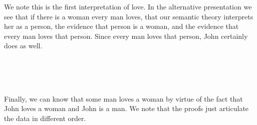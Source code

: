 We note this is the first interpretation of love. In the alternative
presentation we see that if there is a woman every man loves, that our semantic
theory interprets her as a person, the evidence that person is a woman, and the
evidence that every man loves that person. Since every man loves that person,
John certainly does as well.

\begin{code}%
\>[0]\<%
\\
\>[0]\AgdaSpace{}%
\AgdaSymbol{:}\AgdaSpace{}%
\AgdaSpace{}%
\AgdaSpace{}%
\<%
\\
\>[0]\AgdaSpace{}%
\AgdaSymbol{(}\AgdaSpace{}%
\AgdaOperator{\AgdaInductiveConstructor{,}}\AgdaSpace{}%
\AgdaSpace{}%
\AgdaOperator{\AgdaInductiveConstructor{,}}\AgdaSpace{}%
\AgdaSpace{}%
\AgdaSymbol{)}\AgdaSpace{}%
\AgdaSymbol{=}\<%
\\
\>[0][@{}l@{\AgdaIndent{0}}]%
\>[2]\AgdaSpace{}%
\AgdaOperator{\AgdaInductiveConstructor{,}}\AgdaSpace{}%
\AgdaSpace{}%
\AgdaOperator{\AgdaInductiveConstructor{,}}\AgdaSpace{}%
\AgdaSpace{}%
\AgdaSpace{}%
\<%
\end{code}

Finally, we can know that some man loves a woman by virtue of the fact that John
loves a woman and John is a man. We note that the proofs just articulate the
data in different order.

